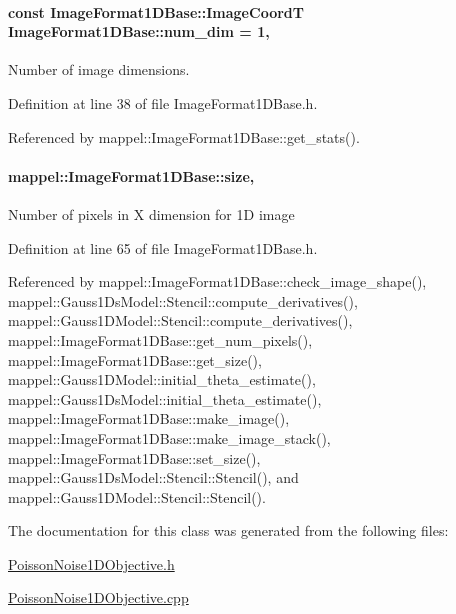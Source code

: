 \paragraph[{\texorpdfstring{num\+\_\+dim}{num_dim}}]{\setlength{\rightskip}{0pt plus 5cm}const {\bf Image\+Format1\+D\+Base\+::\+Image\+CoordT} Image\+Format1\+D\+Base\+::num\+\_\+dim = 1\hspace{0.3cm}{\ttfamily [static]}, {\ttfamily [inherited]}}\hypertarget{classmappel_1_1ImageFormat1DBase_af81159de9010c3618d2f69349c1f2368}{}\label{classmappel_1_1ImageFormat1DBase_af81159de9010c3618d2f69349c1f2368}
Number of image dimensions. 

Definition at line 38 of file Image\+Format1\+D\+Base.\+h.



Referenced by mappel\+::\+Image\+Format1\+D\+Base\+::get\+\_\+stats().

\paragraph[{\texorpdfstring{size}{size}}]{ mappel\+::\+Image\+Format1\+D\+Base\+::size\hspace{0.3cm}{\ttfamily [protected]}, {\ttfamily [inherited]}}\hypertarget{classmappel_1_1ImageFormat1DBase_a8941b4d028e4dd881146a7c1b9039bb1}{}\label{classmappel_1_1ImageFormat1DBase_a8941b4d028e4dd881146a7c1b9039bb1}
Number of pixels in X dimension for 1D image 

Definition at line 65 of file Image\+Format1\+D\+Base.\+h.



Referenced by mappel\+::\+Image\+Format1\+D\+Base\+::check\+\_\+image\+\_\+shape(), mappel\+::\+Gauss1\+Ds\+Model\+::\+Stencil\+::compute\+\_\+derivatives(), mappel\+::\+Gauss1\+D\+Model\+::\+Stencil\+::compute\+\_\+derivatives(), mappel\+::\+Image\+Format1\+D\+Base\+::get\+\_\+num\+\_\+pixels(), mappel\+::\+Image\+Format1\+D\+Base\+::get\+\_\+size(), mappel\+::\+Gauss1\+D\+Model\+::initial\+\_\+theta\+\_\+estimate(), mappel\+::\+Gauss1\+Ds\+Model\+::initial\+\_\+theta\+\_\+estimate(), mappel\+::\+Image\+Format1\+D\+Base\+::make\+\_\+image(), mappel\+::\+Image\+Format1\+D\+Base\+::make\+\_\+image\+\_\+stack(), mappel\+::\+Image\+Format1\+D\+Base\+::set\+\_\+size(), mappel\+::\+Gauss1\+Ds\+Model\+::\+Stencil\+::\+Stencil(), and mappel\+::\+Gauss1\+D\+Model\+::\+Stencil\+::\+Stencil().



The documentation for this class was generated from the following files\+:\begin{DoxyCompactItemize}
\item 
\hyperlink{PoissonNoise1DObjective_8h}{Poisson\+Noise1\+D\+Objective.\+h}\item 
\hyperlink{PoissonNoise1DObjective_8cpp}{Poisson\+Noise1\+D\+Objective.\+cpp}\end{DoxyCompactItemize}

